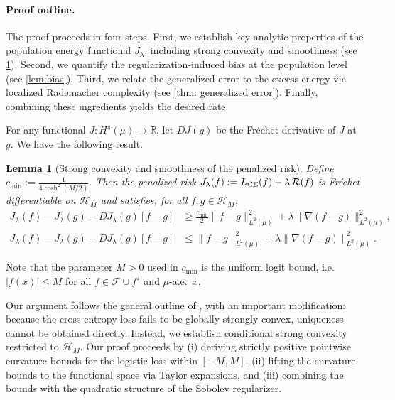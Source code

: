 \documentclass[11pt]{article}
\newcommand{\R}{\mathbb{R}}
\newcommand{\cF}{\mathcal{F}}
\newcommand{\cH}{\mathcal{H}}
\theoremstyle{plain}
\newtheorem{lemma}[theorem]{Lemma}
\theoremstyle{definition}
\theoremstyle{remark}
\begin{document}
\paragraph{Proof outline.} The proof proceeds in four steps. First, we establish key analytic properties of the population energy functional $J_\lambda$, including strong convexity and smoothness (see \cref{lem:J-strong-smooth}). Second, we quantify the regularization-induced bias at the population level (see \cref{lem:bias}). Third, we relate the generalized error to the excess energy via localized Rademacher complexity (see \cref{thm: generalized error}). Finally, combining these ingredients yields the desired rate.


For any functional $ J:H^s(\mu) \rightarrow \R$, let  $D J(g)$ be the Fr\'echet derivative of $J$ at $g$. We have the following result.

\begin{lemma}[Strong convexity and smoothness of the penalized risk]
\label{lem:J-strong-smooth}
Define
$
  c_{\min}:= \frac{1}{4\cosh^2(M/2)}.
$
Then the penalized risk $J_\lambda(f):= L_{\rm CE}(f) + \lambda\,\mathcal{R}(f)$
is Fr\'echet differentiable on $\cH_M$ and satisfies, for all $f,g\in \cH_M$,
\begin{align}
J_\lambda(f)-J_\lambda(g)-DJ_\lambda(g)[f-g]
&\ge
\frac{c_{\min}}{2}\|f-g\|_{L^2(\mu)}^2
+\lambda\|\nabla(f-g)\|_{L^2(\mu)}^2,
\label{eq:J-strong-general}\\
J_\lambda(f)-J_\lambda(g)-DJ_\lambda(g)[f-g]
&\le
\|f-g\|_{L^2(\mu)}^2
+\lambda\|\nabla(f-g)\|_{L^2(\mu)}^2.
\label{eq:J-smooth}
\end{align}
\end{lemma}
Note that the parameter  $M>0$ used in $c_{\min}$ is the uniform logit bound, i.e.\ $|f(x)|\le M$ for all
$f\in \cF \cup f^\star$ and $\mu$-a.e.~$x$.


Our argument follows the general outline of \cite{ding2025semi}, with an important modification: because the cross-entropy loss fails to be globally strongly convex, uniqueness cannot be obtained directly. Instead, we establish conditional strong convexity restricted to $\cH_M$. Our proof proceeds by (i) deriving strictly positive pointwise curvature bounds for the logistic loss within $[-M, M]$, (ii) lifting the curvature bounds to the functional space via Taylor expansions, and (iii) combining the bounds with the quadratic structure of the Sobolev regularizer.
\end{document}
